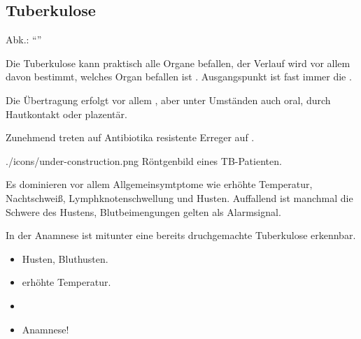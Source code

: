 



\subsection{Tuberkulose}
\label{topic:tuberkulose}

\emph{}
Abk.: "`"'

{
Die Tuberkulose kann praktisch alle Organe befallen, der
Verlauf wird vor allem davon bestimmt, welches
Organ befallen ist . Ausgangspunkt ist fast immer die .

Die Übertragung erfolgt vor allem , aber unter
Umständen auch oral, durch Hautkontakt oder plazentär. 

Zunehmend treten auf Antibiotika resistente Erreger auf 
.

    
}{}
{./icons/under-construction.png}
{Röntgenbild eines TB-Pat\-ient\-en.}{}


{
Es dominieren vor allem Allgemeinsymtptome wie erhöhte
Temperatur, Nachtschweiß, Lymphknotenschwellung und Husten.
Auffallend ist manchmal die Schwere des Hustens, Blutbeimengungen gelten
als Alarmsignal. 

In der Anamnese ist mitunter eine bereits druchgemachte
Tuberkulose erkennbar.
}{
\begin{itemize}
  \item Husten, Bluthusten.
  \item erhöhte Temperatur.
  \item {}
  \item Anamnese!
\end{itemize}
}
{}
{}
{}


